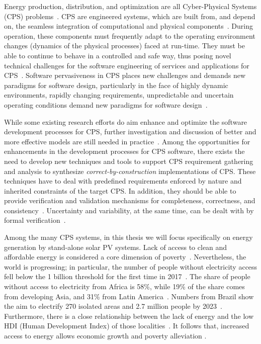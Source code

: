 Energy production, distribution, and optimization are all Cyber-Physical Systems (CPS) problems~\cite{UC}. CPS are engineered systems, which are built from, and depend on, the seamless integration of computational and physical components~\cite{NSF2015,ChavesIBCF19,iet-cps.2018.5006}. During operation, these components must frequently adapt to the operating environment changes (dynamics of the physical processes) faced at run-time. They must be able to continue to behave in a controlled and safe way, thus posing novel technical challenges for the software engineering of services and applications for CPS~\cite{Metzger2014}. Software pervasiveness in CPS places new challenges and demands new paradigms for software design, particularly in the face of highly dynamic environments, rapidly changing requirements, unpredictable and uncertain operating conditions demand new paradigms for software design~\cite{Filieri2015}.

While some existing research efforts do aim enhance and optimize the software development processes for CPS, further investigation and discussion of better and more effective models are still needed in practice~\cite{Al-Jaroodi2016}. Among the opportunities for enhancements in the development processes for CPS software, there exists the need to develop new techniques and tools to support CPS requirement gathering and analysis to synthesize \textit{correct-by-construction} implementations of CPS. These techniques have to deal with predefined requirements enforced by nature and inherited constraints of the target CPS. In addition, they should be able to provide verification and validation mechanisms for completeness, correctness, and consistency~\cite{Al-Jaroodi2016}. Uncertainty and variability, at the same time, can be dealt with by formal verification~\cite{NESSI}. 

Among the many CPS systems, in this thesis we will focus specifically on energy generation by stand-alone solar PV systems. Lack of access to clean and affordable energy is considered a core dimension of poverty~\cite{Hussein2012}. Nevertheless, the world is progressing; in particular, the number of people without electricity access fell below the 1 billion threshold for the first time in 2017~\cite{IEAweo2018}. The share of people without access to electricity from Africa is 58\%, while 19\% of the share comes from developing Asia, and 31\% from Latin America~\cite{IEAweo2018}. Numbers from Brazil show the aim to electrify 270 isolated areas and 2.7 million people by 2023~\cite{EPE2018}. 
Furthermore, there is a close relationship between the lack of energy and the low HDI (Human Development Index) of those localities~\cite{Coelho}. It follows that, increased access to energy allows economic growth and poverty alleviation \cite{Karekesi}.

